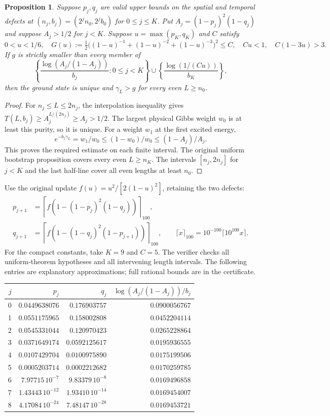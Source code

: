 \documentclass[11pt]{article}
\newtheorem{proposition}{Proposition}
\begin{document}
\begin{proposition}
Suppose $p_j,q_j$ are valid upper bounds on the spatial and temporal defects
at $(n_j,b_j)=(2^jn_0,2^jb_0)$ for $0\le j\le K$. Put
$A_j=(1-p_j)^2(1-q_j)$ and suppose $A_j>1/2$ for $j<K$.
Suppose $u=\max(p_K,q_K)$ and $C$ satisfy
\[
 0<u<1/6,\quad
 G(u):=\tfrac12\big((1-u)^{-1}+(1-u)^{-2}+(1-u)^{-3}\big)^2\le C,
 \quad Cu<1,\quad C(1-3u)>3.
\]
If $g$ is strictly smaller than every member of
\[
 \left\{\frac{\log(A_j/(1-A_j))}{b_j}:0\le j<K\right\}
 \cup\left\{\frac{\log(1/(Cu))}{b_K}\right\},
\]
then the ground state is unique and $\gamma_L>g$ for every even $L\ge n_0$.
\end{proposition}

\begin{proof}
For $n_j\le L\le2n_j$, the interpolation inequality gives
$T(L,b_j)\ge A_j^{L/(2n_j)}\ge A_j>1/2$. The largest physical Gibbs weight
$w_0$ is at least this purity, so it is unique. For a weight $w_1$ at the
first excited energy,
\[
 e^{-b_j\gamma_L}=w_1/w_0\le(1-w_0)/w_0\le(1-A_j)/A_j.
\]
This proves the required estimate on each finite interval. The original
uniform bootstrap proposition covers every even $L\ge n_K$.
The intervals $[n_j,2n_j]$ for $j<K$ and the last half-line cover all
even lengths at least $n_0$.
\end{proof}

Use the original update $f(u)=u^2/[2(1-u)^2]$, retaining the two defects:
\begin{align*}
 p_{j+1}&=\left\lceil f(1-(1-p_j)^2(1-q_j))\right\rceil_{100},\\
 q_{j+1}&=\left\lceil f(1-(1-q_j)^2(1-p_{j+1}))\right\rceil_{100},
 \qquad\lceil x\rceil_{100}=10^{-100}\lceil10^{100}x\rceil.
\end{align*}
For the compact constants, take $K=9$ and $C=5$. The verifier checks all
uniform-theorem hypotheses and all intervening length intervals. The
following entries are explanatory approximations; full rational bounds are
in the certificate.

\begin{center}
\begin{tabular}{rrrr}
\toprule
$j$ & $p_j$ & $q_j$ & $\log(A_j/(1-A_j))/b_j$\\
\midrule
0 & $0.0449638076$ & $0.176903757$ & $0.0900056767$\\
1 & $0.0551175965$ & $0.158002808$ & $0.0452204114$\\
2 & $0.0545331044$ & $0.120970423$ & $0.0265228864$\\
3 & $0.0371649174$ & $0.0592125617$ & $0.0195936555$\\
4 & $0.0107429704$ & $0.0100975890$ & $0.0175199506$\\
5 & $0.0005203714$ & $0.0002212682$ & $0.0170259785$\\
6 & $7.97715\,10^{-7}$ & $9.83379\,10^{-8}$ & $0.0169496858$\\
7 & $1.43443\,10^{-12}$ & $1.93410\,10^{-14}$ & $0.0169454007$\\
8 & $4.17084\,10^{-24}$ & $7.48147\,10^{-28}$ & $0.0169453721$\\
\bottomrule
\end{tabular}
\end{center}
\end{document}
